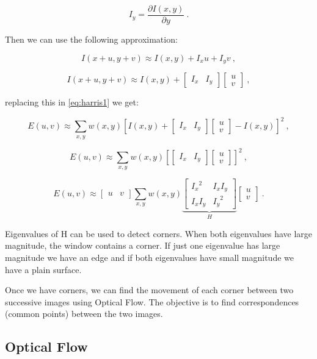 $$
I_y = \frac{\partial{I(x,y)}}{\partial{y}}\ .
$$

Then we can use the following approximation:

$$
I(x+u,y +v) \approx I(x,y) + I_xu + I_yv\ ,
$$

$$
I(x+u,y +v) \approx I(x,y) + \begin{bmatrix} I_x & I_y \end{bmatrix} \begin{bmatrix} u \\ v \end{bmatrix}\ ,
$$ 

\noindent replacing this in \ref{eq:harris1} we get:

$$
E(u,v) \approx \sum\limits_{x,y} { w(x,y) [I(x,y)  + \begin{bmatrix} I_x & I_y \end{bmatrix} \begin{bmatrix} u \\ v \end{bmatrix} - I(x,y)]^2  }\ ,
$$

$$
E(u,v) \approx \sum\limits_{x,y} { w(x,y) [\begin{bmatrix} I_x & I_y \end{bmatrix} \begin{bmatrix} u \\ v \end{bmatrix} ]^2  }\ ,
$$

$$
E(u,v) \approx \begin{bmatrix} u & v \end{bmatrix} \sum\limits_{x,y} w(x,y) \underbrace{\begin{bmatrix} {I_x}^2 & I_x I_y \\ I_x I_y & {I_y}^2 \end{bmatrix}}_{H} \begin{bmatrix} u \\ v \end{bmatrix}\ .
$$


Eigenvalues of H can be used to detect corners. When both eigenvalues have large magnitude, the window contains a corner. If just one 
eigenvalue has large magnitude we have an edge and if both eigenvalues have small magnitude we have a plain surface.

Once we have corners, we can find the movement of each corner between two successive images using Optical Flow. The objective 
is to find correspondences (common points) between the two images.

\subsection{Optical Flow}

